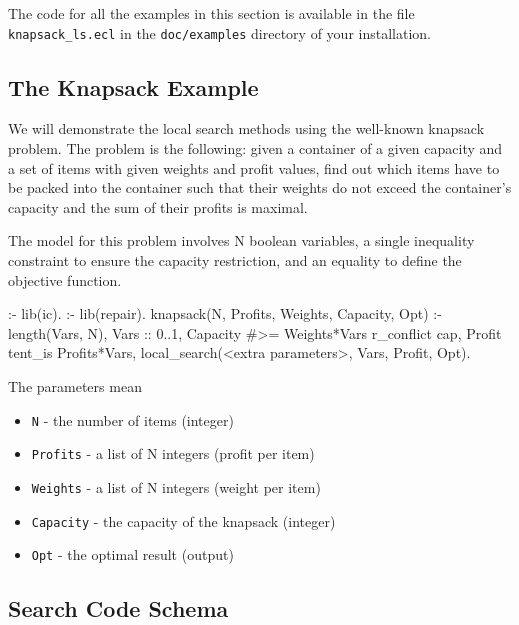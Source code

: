 The {\eclipse} code for all the examples in this section is available
in the file {\tt knapsack_ls.ecl} in the {\tt doc/examples} directory of your
{\eclipse} installation.

\subsection{The Knapsack Example}

We will demonstrate the local search methods using the well-known
knapsack problem. The problem is the following: given a container of
a given capacity and a set of items with given weights and profit
values, find out which items have to be packed into the container
such that their weights do not exceed the container's capacity and
the sum of their profits is maximal.

The model for this problem involves N boolean variables, a single
inequality constraint to ensure the capacity restriction, and an
equality to define the objective function.

\begin{code}
:- lib(ic).
:- lib(repair).
knapsack(N, Profits, Weights, Capacity, Opt) :-
        length(Vars, N),
        Vars :: 0..1,
        Capacity #>= Weights*Vars  r_conflict cap,
        Profit tent_is Profits*Vars,
        local_search(<extra parameters>, Vars, Profit, Opt).
\end{code}
The parameters mean
\begin{itemize}
\item {\tt N} - the number of items (integer)
\item {\tt Profits} - a list of N integers (profit per item)
\item {\tt Weights} - a list of N integers (weight per item)
\item {\tt Capacity} - the capacity of the knapsack (integer)
\item {\tt Opt} - the optimal result (output)
\end{itemize}


\subsection{Search Code Schema}

